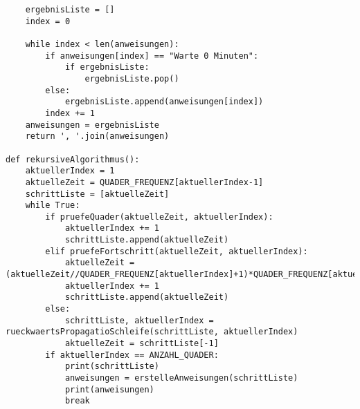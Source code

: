 \documentclass[a4paper,10pt,english]{scrartcl}
\begin{document}
\begin{lstlisting}
    ergebnisListe = []
    index = 0

    while index < len(anweisungen):
        if anweisungen[index] == "Warte 0 Minuten":
            if ergebnisListe:
                ergebnisListe.pop()
        else:
            ergebnisListe.append(anweisungen[index])
        index += 1
    anweisungen = ergebnisListe
    return ', '.join(anweisungen)

def rekursiveAlgorithmus():
    aktuellerIndex = 1
    aktuelleZeit = QUADER_FREQUENZ[aktuellerIndex-1]
    schrittListe = [aktuelleZeit]
    while True:
        if pruefeQuader(aktuelleZeit, aktuellerIndex):
            aktuellerIndex += 1
            schrittListe.append(aktuelleZeit)
        elif pruefeFortschritt(aktuelleZeit, aktuellerIndex):
            aktuelleZeit = (aktuelleZeit//QUADER_FREQUENZ[aktuellerIndex]+1)*QUADER_FREQUENZ[aktuellerIndex]
            aktuellerIndex += 1
            schrittListe.append(aktuelleZeit)
        else:
            schrittListe, aktuellerIndex = rueckwaertsPropagatioSchleife(schrittListe, aktuellerIndex)
            aktuelleZeit = schrittListe[-1]
        if aktuellerIndex == ANZAHL_QUADER:
            print(schrittListe)
            anweisungen = erstelleAnweisungen(schrittListe)
            print(anweisungen)
            break
\end{lstlisting}
\end{document}
